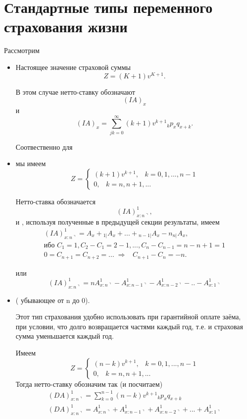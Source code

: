 \section{Стандартные типы переменного страхования жизни} %
Рассмотрим 
\begin{itemize}
	\item {}

	Настоящее значение страховой суммы
	\[Z = (K+1)v^{K+1}.\]

	В этом случае нетто-ставку обозначают
	\[(IA)_x\]
	и 
	\[ (IA)_x = \sum\limits_{jk=0}^{\infty}(k+1)v^{k+1}{}_kp_xq_{x+k}.\]

	Соотвественно для

	\item {} мы имеем
	\[
		Z = \begin{cases}
			(k+1)v^{k+1}, \;\;\; k=0, 1, ... , n-1\\
			0, \;\;\; k = n, n+1, ...
		\end{cases}
	\]

	Нетто-ставка обозначается 
	\[ (IA)_{x:n\urcorner}^{1}, \]
	и , используя полученные в предыдущей секции результаты, имеем
	\begin{gather*}
		(IA)_{x:n\urcorner}^{1} = A_x + {}_{1|}A_x + ...+{}_{n-1|}A_x - n{}_{n|}A_x,\\
		\text{ибо } C_1 = 1, C_2 - C_1 = 2-1, ..., C_n - C_{n-1} = n-n + 1 =1\\
		0 = C_{n+1 }= C_{n+2}=...\; \Rightarrow \;\;\; C_{n+1}-C_n = -n.  
	\end{gather*}

	или
	\[ (IA)_{x:n\urcorner}^{1} = n A_{x:n\urcorner}^{1}- A_{x:n-1\urcorner}^{1} - A_{x:n-2\urcorner}^{1} -..-A_{x:1\urcorner}^{1} \]

	\item {}( убывающее от n до 0).

	Этот тип страхования удобно использовать при гарантийной оплате заёма, при условии, что долго возвращается частями каждый год, т.е. и страховая сумма уменьшается каждый год.

	Имеем 
	\[
		Z=\begin{cases}
			(n-k)v^{k+1}, \;\;\; k=0,1,...,n-1\\
			0, \;\;\; k = n, n+1, ...
		\end{cases}
	\]
	Тогда нетто-ставку обозначим так (и посчитаем)
	\begin{gather*}
		(DA)_{x:n\urcorner}^{1} = \sum\limits_{k=0}^{n-1}(n-k)v^{k+1}{}_kp_xq_{x+k}\\
		(DA)_{x:n\urcorner}^{1} = A_{x:n\urcorner}^{1} + A_{x:n-1\urcorner}^{1}+ A_{x:n-2\urcorner}^{1}+...+A_{x:1\urcorner}^{1}	
	\end{gather*}


\end{itemize}
